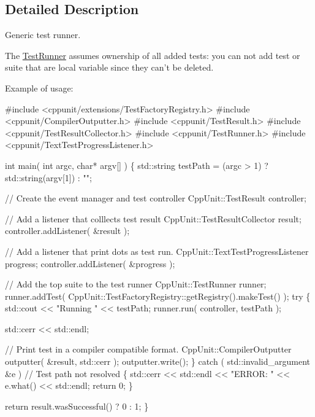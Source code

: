 \subsection{Detailed Description}
Generic test runner.

The \hyperlink{class_test_runner}{Test\-Runner} assumes ownership of all added tests\-: you can not add test or suite that are local variable since they can't be deleted. 

Example of usage\-: 
\begin{DoxyCode}
\textcolor{preprocessor}{#include <cppunit/extensions/TestFactoryRegistry.h>}
\textcolor{preprocessor}{#include <cppunit/CompilerOutputter.h>}
\textcolor{preprocessor}{#include <cppunit/TestResult.h>}
\textcolor{preprocessor}{#include <cppunit/TestResultCollector.h>}
\textcolor{preprocessor}{#include <cppunit/TestRunner.h>}
\textcolor{preprocessor}{#include <cppunit/TextTestProgressListener.h>}


\textcolor{keywordtype}{int} 
main( \textcolor{keywordtype}{int} argc, \textcolor{keywordtype}{char}* argv[] )
\{
  std::string testPath = (argc > 1) ? std::string(argv[1]) : \textcolor{stringliteral}{""};

  \textcolor{comment}{// Create the event manager and test controller}
  CppUnit::TestResult controller;

  \textcolor{comment}{// Add a listener that colllects test result}
  CppUnit::TestResultCollector result;
  controller.addListener( &result );        

  \textcolor{comment}{// Add a listener that print dots as test run.}
  CppUnit::TextTestProgressListener progress;
  controller.addListener( &progress );      

  \textcolor{comment}{// Add the top suite to the test runner}
  CppUnit::TestRunner runner;
  runner.addTest( CppUnit::TestFactoryRegistry::getRegistry().makeTest() );   
  \textcolor{keywordflow}{try}
  \{
    std::cout << \textcolor{stringliteral}{"Running "}  <<  testPath;
    runner.run( controller, testPath );

    std::cerr << std::endl;

    \textcolor{comment}{// Print test in a compiler compatible format.}
    CppUnit::CompilerOutputter outputter( &result, std::cerr );
    outputter.write();                      
  \}
  \textcolor{keywordflow}{catch} ( std::invalid\_argument &e )  \textcolor{comment}{// Test path not resolved}
  \{
    std::cerr  <<  std::endl  
               <<  \textcolor{stringliteral}{"ERROR: "}  <<  e.what()
               << std::endl;
    \textcolor{keywordflow}{return} 0;
  \}

  \textcolor{keywordflow}{return} result.wasSuccessful() ? 0 : 1;
\}
\end{DoxyCode}
 

